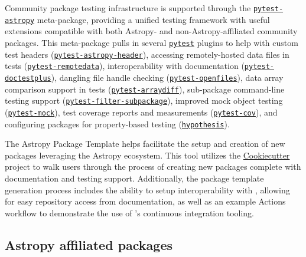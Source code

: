 \documentclass[modern]{aastex631}
\newcommand{\secauthor}[1]{{\color{blue}Author:~\textit{#1}}}
\begin{document}
Community package testing infrastructure is supported through the
\href{https://github.com/astropy/pytest-astropy}{\texttt{pytest-astropy}}
meta-package, providing a unified testing framework with useful extensions
compatible with both Astropy- and non-Astropy-affiliated community packages.
This meta-package pulls in several
\href{https://github.com/pytest-dev/pytest}{\texttt{pytest}} plugins to help
with custom test headers
(\href{https://github.com/astropy/pytest-astropy-header}{\texttt{pytest-astropy-header}}),
accessing remotely-hosted data files in tests
(\href{https://github.com/astropy/pytest-remotedata}{\texttt{pytest-remotedata}}),
interoperability with documentation
(\href{https://github.com/astropy/pytest-doctestplus}{\texttt{pytest-doctestplus}}),
dangling file handle checking
(\href{https://github.com/astropy/pytest-openfiles}{\texttt{pytest-openfiles}}),
data array comparison support in tests
(\href{https://github.com/astropy/pytest-arraydiff}{\texttt{pytest-arraydiff}}),
sub-package command-line testing support
(\href{https://github.com/astropy/pytest-filter-subpackage}{\texttt{pytest-filter-subpackage}}),
improved mock object testing
(\href{https://github.com/pytest-dev/pytest-mock}{\texttt{pytest-mock}}), test
coverage reports and measurements
(\href{https://github.com/pytest-dev/pytest-cov}{\texttt{pytest-cov}}), and
configuring packages for property-based testing
(\href{https://github.com/HypothesisWorks/hypothesis}{\texttt{hypothesis}}).

The Astropy Package Template helps facilitate the setup and creation of new
\python packages leveraging the Astropy ecosystem. This tool utilizes the
\href{https://github.com/cookiecutter/cookiecutter}{Cookiecutter} project to
walk users through the process of creating new packages complete with
documentation and testing support. Additionally, the package template
generation process includes the ability to setup interoperability with
\github, allowing for easy repository access from documentation, as well as an
example \github Actions workflow to demonstrate the use of \github's
continuous integration tooling.

\subsection{Astropy affiliated packages}


\end{document}
